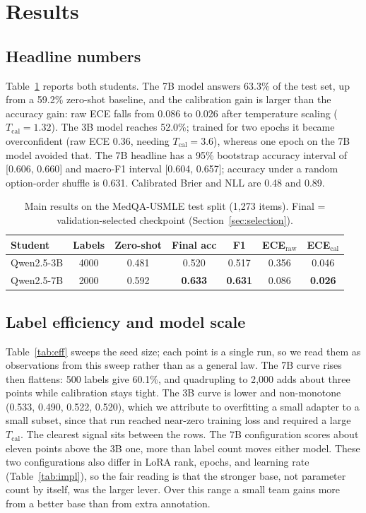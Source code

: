 \documentclass[conference]{IEEEtran}
\begin{document}
\section{Results}
\label{sec:results}

\subsection{Headline numbers}
Table~\ref{tab:main} reports both students. The 7B model answers 63.3\% of the test set, up from a 59.2\% zero-shot baseline, and the calibration gain is larger than the accuracy gain: raw ECE falls from 0.086 to 0.026 after temperature scaling ($T_{\text{cal}}=1.32$). The 3B model reaches 52.0\%; trained for two epochs it became overconfident (raw ECE 0.36, needing $T_{\text{cal}}=3.6$), whereas one epoch on the 7B model avoided that. The 7B headline has a 95\% bootstrap accuracy interval of [0.606, 0.660] and macro-F1 interval [0.604, 0.657]; accuracy under a random option-order shuffle is 0.631. Calibrated Brier and NLL are 0.48 and 0.89.

\begin{table}[tb]
\caption{Main results on the MedQA-USMLE test split (1{,}273 items). Final = validation-selected checkpoint (Section~\ref{sec:selection}).}
\label{tab:main}
\centering
\small
\setlength{\tabcolsep}{3.5pt}
\begin{tabular}{@{}lcccccc@{}}
\toprule
Student & Labels & Zero-shot & Final acc & F1 & ECE$_\text{raw}$ & ECE$_\text{cal}$ \\
\midrule
Qwen2.5-3B & 4000 & 0.481 & 0.520 & 0.517 & 0.356 & 0.046 \\
Qwen2.5-7B & 2000 & 0.592 & \textbf{0.633} & \textbf{0.631} & 0.086 & \textbf{0.026} \\
\bottomrule
\end{tabular}
\end{table}

\subsection{Label efficiency and model scale}
Table~\ref{tab:eff} sweeps the seed size; each point is a single run, so we read them as observations from this sweep rather than as a general law. The 7B curve rises then flattens: 500 labels give 60.1\%, and quadrupling to 2{,}000 adds about three points while calibration stays tight. The 3B curve is lower and non-monotone (0.533, 0.490, 0.522, 0.520), which we attribute to overfitting a small adapter to a small subset, since that run reached near-zero training loss and required a large $T_{\text{cal}}$. The clearest signal sits between the rows. The 7B configuration scores about eleven points above the 3B one, more than label count moves either model. These two configurations also differ in LoRA rank, epochs, and learning rate (Table~\ref{tab:impl}), so the fair reading is that the stronger base, not parameter count by itself, was the larger lever. Over this range a small team gains more from a better base than from extra annotation.
\end{document}
